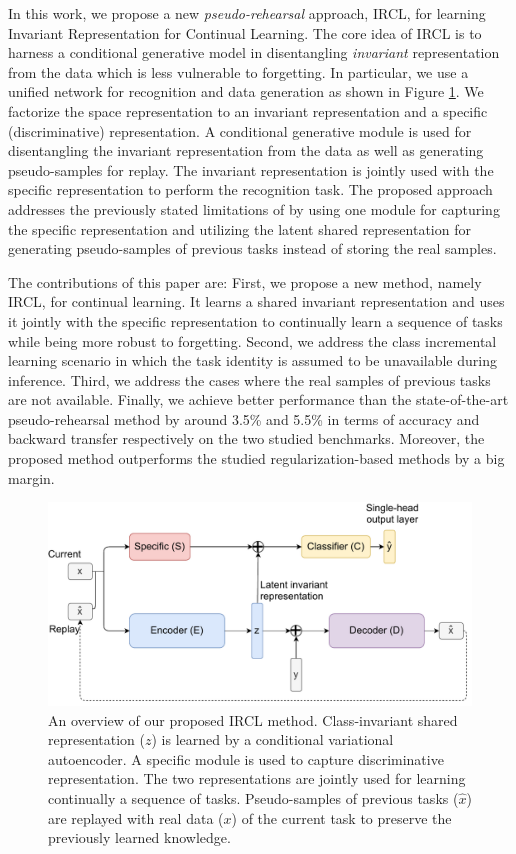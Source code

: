 \documentclass[letterpaper]{article} %
\begin{document}
In this work, we propose a new \textit{pseudo-rehearsal} approach, IRCL, for learning Invariant Representation for Continual Learning. The core idea of IRCL is to harness a conditional generative model in disentangling \textit{invariant} representation from the data which is less vulnerable to forgetting. In particular, we use a unified network for recognition and data generation as shown in Figure \ref{overview}. We factorize the space representation to an invariant representation and a specific (discriminative) representation. A conditional generative module is used for disentangling the invariant representation from the data as well as generating pseudo-samples for replay. The invariant representation is jointly used with the specific representation to perform the recognition task. The proposed approach addresses the previously stated limitations of \cite{ebrahimi2020adversarial} by using one module for capturing the specific representation and utilizing the latent shared representation for generating pseudo-samples of previous tasks instead of storing the real samples.

The contributions of this paper are: First, we propose a new method, namely IRCL, for continual learning. It learns a shared invariant representation and uses it jointly with the specific representation to continually learn a sequence of tasks while being more robust to forgetting. Second, we address the class incremental learning scenario in which the task identity is assumed to be unavailable during inference. Third, we address the cases where the real samples of previous tasks are not available. Finally, we achieve better performance than the state-of-the-art pseudo-rehearsal method by around 3.5\% and 5.5\% in terms of accuracy and backward transfer respectively on the two studied benchmarks. Moreover, the proposed method outperforms the studied regularization-based methods by a big margin.

\begin{figure}
\centering
\includegraphics[width=\columnwidth]{pic/method_overview_v3.pdf}
\caption{An overview of our proposed IRCL method. Class-invariant shared representation ($z$) is learned by a conditional variational autoencoder. A specific module is used to capture discriminative representation. The two representations are jointly used for learning continually a sequence of tasks. Pseudo-samples of previous tasks ($\hat{x}$) are replayed with real data ($x$) of the current task to preserve the previously learned knowledge.}
\label{overview}
\end{figure}
\end{document}
